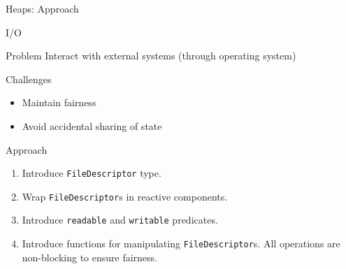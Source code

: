 \documentclass{beamer}
\begin{document}
\begin{frame}[fragile]{Heaps:  Approach}

\end{frame}






\begin{frame}[fragile]{I/O}
  \begin{block}{Problem}
    Interact with external systems (through operating system)
  \end{block}

  \begin{block}{Challenges}
    \begin{itemize}
      \item Maintain fairness
      \item Avoid accidental sharing of state
    \end{itemize}
  \end{block}

  \begin{block}{Approach}
    \begin{enumerate}
    \item Introduce \verb+FileDescriptor+ type.
    \item Wrap \verb+FileDescriptor+s in reactive components.
    \item Introduce \verb+readable+ and \verb+writable+ predicates.
    \item Introduce functions for manipulating \verb+FileDescriptor+s.  All operations are non-blocking to ensure fairness.
    \end{enumerate}
  \end{block}
\end{frame}
\end{document}
